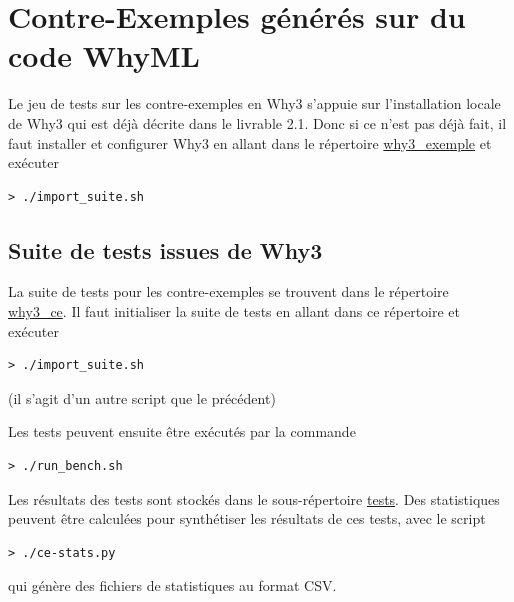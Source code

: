 \documentclass[a4paper,11pt]{article}
\begin{document}
\section{Contre-Exemples générés sur du code  WhyML}

Le jeu de tests sur les contre-exemples en Why3 s'appuie sur
l'installation locale de Why3 qui est déjà décrite dans le livrable
2.1. Donc si ce n'est pas déjà fait, il faut installer et configurer Why3 en allant dans le répertoire \url{why3_exemple} et exécuter
\begin{lstlisting}
> ./import_suite.sh
\end{lstlisting}

\subsection{Suite de tests issues de Why3}

La suite de tests pour les contre-exemples se trouvent dans le
répertoire \url{why3_ce}. Il faut initialiser la suite de tests en
allant dans ce répertoire et exécuter
\begin{lstlisting}
> ./import_suite.sh
\end{lstlisting}
(il s'agit d'un autre script que le précédent)

Les tests peuvent ensuite être exécutés par la commande
\begin{lstlisting}
> ./run_bench.sh
\end{lstlisting}
Les résultats des tests sont stockés dans le sous-répertoire
\url{tests}. Des statistiques peuvent être calculées pour synthétiser
les résultats de ces tests, avec le script
\begin{lstlisting}
> ./ce-stats.py
\end{lstlisting}
qui génère des fichiers de statistiques au format CSV.
\end{document}
